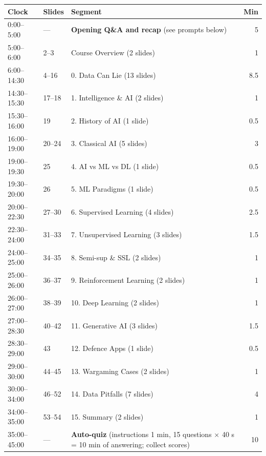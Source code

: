 \documentclass[11pt]{article}
\begin{document}
\begin{center}\small\renewcommand{\arraystretch}{1.2}\begin{tabularx}{\textwidth}{@{}l l X r@{}}\toprule\textbf{Clock} & \textbf{Slides} & \textbf{Segment} & \textbf{Min}\\\midrule

0:00--5:00 & --- & \textbf{Opening Q\&A and recap} (see prompts below) & 5\\

5:00--6:00 & 2--3 & Course Overview (2 slides) & 1\\

6:00--14:30 & 4--16 & 0. Data Can Lie (13 slides) & 8.5\\

14:30--15:30 & 17--18 & 1. Intelligence \& AI (2 slides) & 1\\

15:30--16:00 & 19 & 2. History of AI (1 slide) & 0.5\\

16:00--19:00 & 20--24 & 3. Classical AI (5 slides) & 3\\

19:00--19:30 & 25 & 4. AI vs ML vs DL (1 slide) & 0.5\\

19:30--20:00 & 26 & 5. ML Paradigms (1 slide) & 0.5\\

20:00--22:30 & 27--30 & 6. Supervised Learning (4 slides) & 2.5\\

22:30--24:00 & 31--33 & 7. Unsupervised Learning (3 slides) & 1.5\\

24:00--25:00 & 34--35 & 8. Semi-sup \& SSL (2 slides) & 1\\

25:00--26:00 & 36--37 & 9. Reinforcement Learning (2 slides) & 1\\

26:00--27:00 & 38--39 & 10. Deep Learning (2 slides) & 1\\

27:00--28:30 & 40--42 & 11. Generative AI (3 slides) & 1.5\\

28:30--29:00 & 43 & 12. Defence Apps (1 slide) & 0.5\\

29:00--30:00 & 44--45 & 13. Wargaming Cases (2 slides) & 1\\

30:00--34:00 & 46--52 & 14. Data Pitfalls (7 slides) & 4\\

34:00--35:00 & 53--54 & 15. Summary (2 slides) & 1\\

35:00--45:00 & --- & \textbf{Auto-quiz} (instructions 1 min, 15 questions $\times$ 40 s = 10 min of answering; collect scores) & 10\\\bottomrule\end{tabularx}\end{center}
\end{document}
